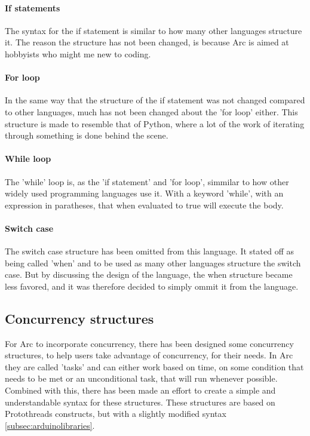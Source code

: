 \paragraph*{If statements}
The syntax for the if statement is similar to how many other languages structure it. The reason the structure has not been changed, is because Arc is aimed at hobbyists who might me new to coding.

\paragraph*{For loop}
In the same way that the structure of the if statement was not changed compared to other languages, much has not been changed about the 'for loop' either. This structure is made to resemble that of Python, where a lot of the work of iterating through something is done behind the scene.

\paragraph*{While loop}
The 'while' loop is, as the 'if statement' and 'for loop', simmilar to how other widely used programming languages use it. With a keyword 'while', with an expression in paratheses, that when evaluated to true will execute the body.

\paragraph*{Switch case}
The switch case structure has been omitted from this language. It stated off as being called 'when' and to be used as many other languages structure the switch case. But by discussing the design of the language, the when structure became less favored, and it was therefore decided to simply ommit it from the language.



\subsection{Concurrency structures}\label{sec:concurrency structures}
For Arc to incorporate concurrency, there has been designed some concurrency structures, to help users take advantage of concurrency, for their needs. In Arc they are called 'tasks' and can either work based on time, on some condition that needs to be met or an unconditional task, that will run whenever possible. Combined with this, there has been made an effort to create a simple and understandable syntax for these structures. These structures are based on Protothreads constructs, but with a slightly modified syntax \ref{subsec:arduinolibraries}.


